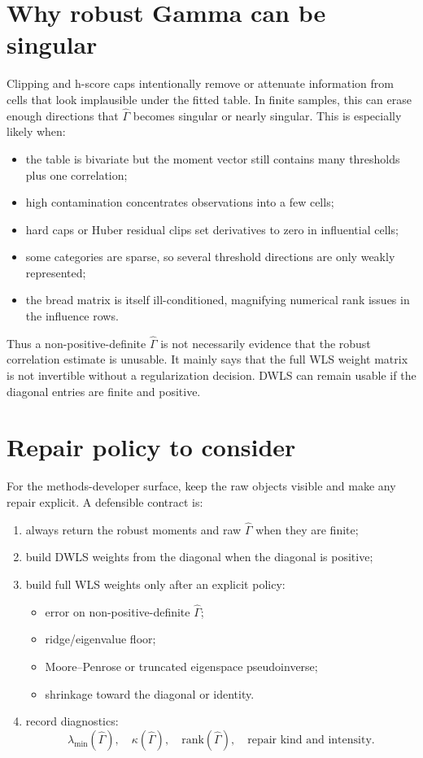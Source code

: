 \documentclass[11pt]{article}
\newcommand{\Ghat}{\widehat\Gamma}
\begin{document}
\section*{Why robust Gamma can be singular}

Clipping and h-score caps intentionally remove or attenuate information from
cells that look implausible under the fitted table. In finite samples, this can
erase enough directions that $\Ghat$ becomes singular or nearly singular.
This is especially likely when:

\begin{itemize}
\item the table is bivariate but the moment vector still contains many
  thresholds plus one correlation;
\item high contamination concentrates observations into a few cells;
\item hard caps or Huber residual clips set derivatives to zero in influential
  cells;
\item some categories are sparse, so several threshold directions are only
  weakly represented;
\item the bread matrix is itself ill-conditioned, magnifying numerical rank
  issues in the influence rows.
\end{itemize}

Thus a non-positive-definite $\Ghat$ is not necessarily evidence that the
robust correlation estimate is unusable. It mainly says that the full WLS
weight matrix is not invertible without a regularization decision. DWLS can
remain usable if the diagonal entries are finite and positive.

\section*{Repair policy to consider}

For the methods-developer surface, keep the raw objects visible and make any
repair explicit. A defensible contract is:

\begin{enumerate}
\item always return the robust moments and raw $\Ghat$ when they are finite;
\item build DWLS weights from the diagonal when the diagonal is positive;
\item build full WLS weights only after an explicit policy:
  \begin{itemize}
  \item error on non-positive-definite $\Ghat$;
  \item ridge/eigenvalue floor;
  \item Moore--Penrose or truncated eigenspace pseudoinverse;
  \item shrinkage toward the diagonal or identity.
  \end{itemize}
\item record diagnostics:
  \[
    \lambda_{\min}(\Ghat),\quad
    \kappa(\Ghat),\quad
    \mathrm{rank}(\Ghat),\quad
    \text{repair kind and intensity}.
  \]
\end{enumerate}
\end{document}
